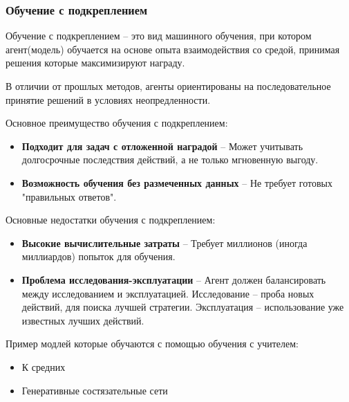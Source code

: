\documentclass[../part_1.tex]{subfiles}
\begin{document}
\subsubsection{Обучение с подкреплением} %
    \label{sec:reinforcement_learning}
    \par Обучение с подкреплением --  это вид машинного обучения, при котором агент(модель) обучается на основе опыта взаимодействия со средой, принимая решения которые максимизируют награду.
    \par В отличии от прошлых методов, агенты ориентированы на последовательное принятие решений в условиях неопредленности.
    \par Основное преимущество обучения с подкреплением:
    \begin{itemize}
        \item \textbf{Подходит для задач с отложенной наградой} -- Может учитывать долгосрочные последствия действий, а не только мгновенную выгоду.
        \item \textbf{Возможность обучения без размеченных данных} -- Не требует готовых "правильных ответов".
    \end{itemize}
    \par Основные недостатки обучения с подкреплением:
    \begin{itemize}
        \item \textbf{Высокие вычислительные затраты} -- Требует миллионов (иногда миллиардов) попыток для обучения.
        \item \textbf{Проблема исследования-эксплуатации} -- Агент должен балансировать между исследованием и эксплуатацией. Исследование -- проба новых действий, для поиска лучшей стратегии. Эксплуатация -- использование уже известных лучших действий.
    \end{itemize}
    \par Пример модлей которые обучаются с помощью обучения с учителем:
    \begin{itemize}
        \item К средних
        \item Генеративные состязательные сети
    \end{itemize}
\end{document}

